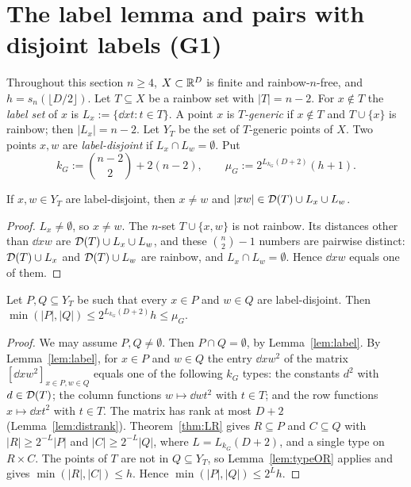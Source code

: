 \section{The label lemma and pairs with disjoint labels (G1)}\label{sec:G1}

Throughout this section $n\ge4$, $X\subset\mathbb{R}^D$ is finite and rainbow-$n$-free, and $h=s_n(\lfloor D/2\rfloor)$.
Let $T\subseteq X$ be a rainbow set with $|T|=n-2$. For $x\notin T$ the \emph{label set} of $x$ is
$L_x:=\{\dd xt:t\in T\}$. A point $x$ is \emph{$T$-generic} if $x\notin T$ and $T\cup\{x\}$ is rainbow; then
$|L_x|=n-2$. Let $Y_T$ be the set of $T$-generic points of $X$. Two points $x,w$ are \emph{label-disjoint} if
$L_x\cap L_w=\emptyset$. Put
\[
k_G:=\binom{n-2}{2}+2(n-2),\qquad \mu_G:=2^{L_{k_G}(D+2)}(h+1).
\]

\begin{lemma}\label{lem:label}
If $x,w\in Y_T$ are label-disjoint, then $x\ne w$ and $|xw|\in\mathcal{D}(T)\cup L_x\cup L_w$.
\end{lemma}
\begin{proof}
$L_x\ne\emptyset$, so $x\ne w$. The $n$-set $T\cup\{x,w\}$ is not rainbow. Its distances other than $\dd xw$
are $\mathcal{D}(T)\cup L_x\cup L_w$, and these $\binom n2-1$ numbers are pairwise distinct: $\mathcal{D}(T)\cup L_x$ and
$\mathcal{D}(T)\cup L_w$ are rainbow, and $L_x\cap L_w=\emptyset$. Hence $\dd xw$ equals one of them.
\end{proof}

\begin{theorem}\label{thm:G1bip}
Let $P,Q\subseteq Y_T$ be such that every $x\in P$ and $w\in Q$ are label-disjoint. Then
$\min(|P|,|Q|)\le 2^{L_{k_G}(D+2)}h\le\mu_G$.
\end{theorem}
\begin{proof}
We may assume $P,Q\neq\emptyset$. Then $P\cap Q=\emptyset$, by Lemma~\ref{lem:label}. By Lemma~\ref{lem:label},
for $x\in P$ and $w\in Q$ the entry $\dd xw^2$ of the matrix $[\dd xw^2]_{x\in P,w\in Q}$ equals one of the following
$k_G$ types: the constants $d^2$ with $d\in\mathcal{D}(T)$; the column functions $w\mapsto\dd wt^2$ with $t\in T$; and the
row functions $x\mapsto\dd xt^2$ with $t\in T$. The matrix has rank at most $D+2$ (Lemma~\ref{lem:distrank}).
Theorem~\ref{thm:LR} gives $R\subseteq P$ and $C\subseteq Q$ with $|R|\ge2^{-L}|P|$ and $|C|\ge2^{-L}|Q|$, where
$L=L_{k_G}(D+2)$, and a single type on $R\times C$. The points of $T$ are not in $Q\subseteq Y_T$, so
Lemma~\ref{lem:typeOR} applies and gives $\min(|R|,|C|)\le h$. Hence $\min(|P|,|Q|)\le2^Lh$.
\end{proof}

